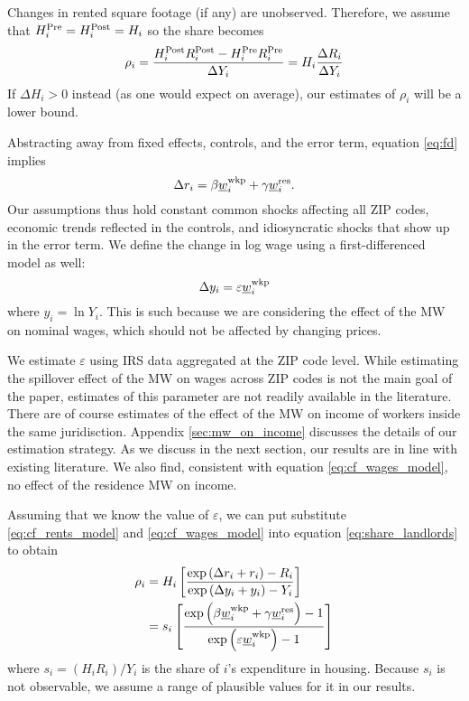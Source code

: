 Changes in rented square footage (if any) are unobserved.
Therefore, we assume that
$H^{\text{Pre}}_i = H^{\text{Post}}_i = H_i$ 
so the share becomes
\begin{equation}\label{eq:share_landlords}
    \rho_i = \frac{H^{\text{Post}}_i R^{\text{Post}}_i - H^{\text{Pre}}_i R^{\text{Pre}}_i}{\Delta Y_i} = 
                H_i \frac{\Delta R_i}{\Delta Y_i}
\end{equation}
If $\Delta H_i > 0$ instead (as one would expect on average), 
our estimates of $\rho_i$ will be a lower bound.

Abstracting away from fixed effects, controls, and the error term, 
equation \eqref{eq:fd} implies
\begin{equation}\label{eq:cf_rents_model}
    \Delta r_i = \beta \underline{w}_i^{\text{wkp}} + \gamma \underline{w}_i^{\text{res}} .
\end{equation}
Our assumptions thus hold 
constant common shocks affecting all ZIP codes,
economic trends reflected in the controls, and
idiosyncratic shocks that show up in the error term.
We define the change in log wage using a first-differenced model as well:
\begin{equation}\label{eq:cf_wages_model}
    \Delta y_i = \varepsilon \underline{w}_i^{\text{wkp}}
\end{equation}
where $y_i=\ln Y_i$.
This is such because we are considering the effect of the MW on nominal wages,
which should not be affected by changing prices.

We estimate $\varepsilon$ using IRS data aggregated at the ZIP code level.
While estimating the spillover effect of the MW on wages across ZIP codes is 
not the main goal of the paper, 
estimates of this parameter are not readily available in the literature.
There are of course estimates of the effect of the MW on income of workers
inside the same juridisction.
Appendix \ref{sec:mw_on_income} discusses the details of our estimation 
strategy.
As we discuss in the next section, our results are in line with existing 
literature.
We also find, consistent with equation \eqref{eq:cf_wages_model}, no effect 
of the residence MW on income.

Assuming that we know the value of $\varepsilon$, we can put substitute
\eqref{eq:cf_rents_model} and \eqref{eq:cf_wages_model} into equation
\eqref{eq:share_landlords} to obtain
\begin{equation}\label{eq:rho}
    \begin{split}
        \rho_i & = H_i \left[ 
        \frac{\exp \left(\Delta r_i + r_i \right) - R_i }
             {\exp \left(\Delta y_i + y_i \right) - Y_i }
        \right] \\
        & = s_i \left[
            \frac{\exp \left( \beta \underline{w}_i^{\text{wkp}} + \gamma \underline{w}_i^{\text{res}} \right) - 1 }
                {\exp \left( \varepsilon \underline{w}_i^{\text{wkp}} \right) - 1 }
            \right]
    \end{split}
\end{equation}
where $s_i = \left(H_i R_i\right)/Y_i$ is the share of $i$'s expenditure in 
housing.
Because $s_i$ is not observable, we assume a range of plausible values for it
in our results.

